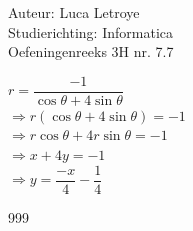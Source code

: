 \documentclass[a4paper]{article}
\begin{document}
  
\noindent \large Auteur: Luca Letroye        \\
\noindent \large Studierichting: Informatica \\
\noindent \large Oefeningenreeks 3H nr. 7.7 \\

\medskip

\normalsize

$r = \dfrac{-1}{\cos\theta + 4\sin\theta}$\\

$\Rightarrow r(\cos\theta +4\sin\theta) = -1$\\

$\Rightarrow r\cos\theta +4r\sin\theta = -1$\\

$\Rightarrow x+4y=-1$\\

$\Rightarrow y =\dfrac{-x}{4} - \dfrac{1}{4}$\\



\begin{thebibliography}{999}
\end{thebibliography}
\end{document}

